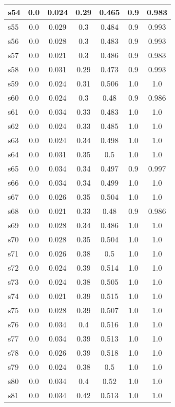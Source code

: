 \documentclass{article}
\begin{document}
\begin{tabular}{|l|c|c|c|c|c|c|}
\hline
s54 &0.0 & 0.024 & 0.29 & 0.465 & 0.9 & 0.983\\
\hline
s55 &0.0 & 0.029 & 0.3 & 0.484 & 0.9 & 0.993\\
\hline
s56 &0.0 & 0.028 & 0.3 & 0.483 & 0.9 & 0.993\\
\hline
s57 &0.0 & 0.021 & 0.3 & 0.486 & 0.9 & 0.983\\
\hline
s58 &0.0 & 0.031 & 0.29 & 0.473 & 0.9 & 0.993\\
\hline
s59 &0.0 & 0.024 & 0.31 & 0.506 & 1.0 & 1.0\\
\hline
s60 &0.0 & 0.024 & 0.3 & 0.48 & 0.9 & 0.986\\
\hline
s61 &0.0 & 0.034 & 0.33 & 0.483 & 1.0 & 1.0\\
\hline
s62 &0.0 & 0.024 & 0.33 & 0.485 & 1.0 & 1.0\\
\hline
s63 &0.0 & 0.024 & 0.34 & 0.498 & 1.0 & 1.0\\
\hline
s64 &0.0 & 0.031 & 0.35 & 0.5 & 1.0 & 1.0\\
\hline
s65 &0.0 & 0.034 & 0.34 & 0.497 & 0.9 & 0.997\\
\hline
s66 &0.0 & 0.034 & 0.34 & 0.499 & 1.0 & 1.0\\
\hline
s67 &0.0 & 0.026 & 0.35 & 0.504 & 1.0 & 1.0\\
\hline
s68 &0.0 & 0.021 & 0.33 & 0.48 & 0.9 & 0.986\\
\hline
s69 &0.0 & 0.028 & 0.34 & 0.486 & 1.0 & 1.0\\
\hline
s70 &0.0 & 0.028 & 0.35 & 0.504 & 1.0 & 1.0\\
\hline
s71 &0.0 & 0.026 & 0.38 & 0.5 & 1.0 & 1.0\\
\hline
s72 &0.0 & 0.024 & 0.39 & 0.514 & 1.0 & 1.0\\
\hline
s73 &0.0 & 0.024 & 0.38 & 0.505 & 1.0 & 1.0\\
\hline
s74 &0.0 & 0.021 & 0.39 & 0.515 & 1.0 & 1.0\\
\hline
s75 &0.0 & 0.028 & 0.39 & 0.507 & 1.0 & 1.0\\
\hline
s76 &0.0 & 0.034 & 0.4 & 0.516 & 1.0 & 1.0\\
\hline
s77 &0.0 & 0.034 & 0.39 & 0.513 & 1.0 & 1.0\\
\hline
s78 &0.0 & 0.026 & 0.39 & 0.518 & 1.0 & 1.0\\
\hline
s79 &0.0 & 0.024 & 0.38 & 0.5 & 1.0 & 1.0\\
\hline
s80 &0.0 & 0.034 & 0.4 & 0.52 & 1.0 & 1.0\\
\hline
s81 &0.0 & 0.034 & 0.42 & 0.513 & 1.0 & 1.0\\

\end{tabular}
\end{document}
